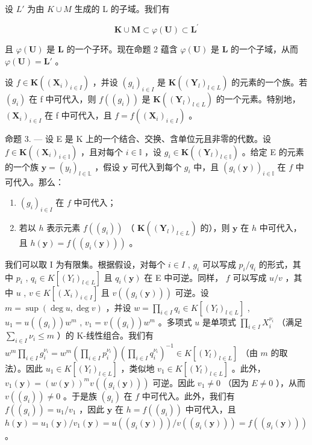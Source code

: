 设 \(L'\) 为由 \(K \cup M\) 生成的 L 的子域。我们有

\[
\mathbf {K} \cup \mathbf {M} \subset \varphi (\mathbf {U}) \subset \mathbf {L} ^ {\prime}
\]

且 \(\varphi(\mathbf{U})\) 是 \(\mathbf{L}\) 的一个子环。现在命题 2 蕴含 \(\varphi(\mathbf{U})\) 是 \(\mathbf{L}\) 的一个子域，从而 \(\varphi(\mathbf{U}) = \mathbf{L}'\) 。

设 \(f \in \mathbf{K}((\mathbf{X}_i)_{i \in I})\) ，并设 \((g_i)_{i \in I}\) 是 \(\mathbf{K}((\mathbf{Y}_l)_{l \in L})\) 的元素的一个族。若 \((g_{i})\) 在 f 中可代入，则 \(f((g_{i}))\) 是 \(\mathbf{K}((\mathbf{Y}_{l})_{l\in L})\) 的一个元素。特别地， \((\mathbf{X}_{i})_{i\in I}\) 在 f 中可代入，且 \(f=f((\mathbf{X}_{i})_{i\in I})\) 。

命题 3. --- 设 E 是 K 上的一个结合、交换、含单位元且非零的代数。设 \(f \in \mathbf{K}((\mathbf{X}_i)_{i \in \mathbb{I}})\) ，且对每个 \(i \in \mathbb{I}\) ，设 \(g_i \in \mathbf{K}((\mathbf{Y}_l)_{l \in \mathbb{I}})\) 。给定 E 的元素的一个族 \(\mathbf{y} = (y_l)_{l \in \mathbb{L}}\) ，假设 \(\mathbf{y}\) 可代入到每个 \(g_i\) 中，且 \((g_i(\mathbf{y}))_{i \in \mathbb{I}}\) 在 \(f\) 中可代入。那么：

\begin{enumerate}
\def\labelenumi{(\roman{enumi})}
\item
  \((g_{i})_{i\in I}\) 在 \(f\) 中可代入；
\item
  若以 \(h\) 表示元素 \(f((g_i))\) （ \(\mathbf{K}((\mathbf{Y}_l)_{l \in L})\) 的），则 \(\mathbf{y}\) 在 \(h\) 中可代入，且 \(h(\mathbf{y}) = f((g_i(\mathbf{y})))\) 。
\end{enumerate}

我们可以取 I 为有限集。根据假设，对每个 \(i \in I\) , \(g_i\) 可以写成 \(p_i/q_i\) 的形式，其中 \(p_i\) , \(q_i \in K[(Y_l)_{l \in L}]\) 且 \(q_i(\mathbf{y})\) 在 E 中可逆。同样， \(f\) 可以写成 \(u/v\) ，其中 \(u\) , \(v \in K[(X_i)_{i \in I}]\) 且 \(v((g_i(\mathbf{y})))\) 可逆。设 \(m = \sup(\deg u, \deg v)\) ，并设 \(w = \prod_{i \in I} q_i \in K[(Y_l)_{l \in L}]\) , \(u_1 = u((g_i))w^m\) , \(v_1 = v((g_i))w^m\) 。多项式 \(u\) 是单项式 \(\prod_{i \in I} X_i^{\nu_i}\) （满足 \(\sum_{i \in I} \nu_i \leqslant m\) ）的 K-线性组合。我们有 \(w^m \prod_{i \in I} g_i^{\nu_i} = w^m\left(\prod_{i \in I} p_i^{\nu_i}\right)\left(\prod_{i \in I} q_i^{\nu_i}\right)^{-1} \in K[(Y_l)_{l \in L}]\) （由 \(m\) 的取法）。因此 \(u_1 \in K[(Y_l)_{l \in L}]\) ，类似地 \(v_1 \in K[(Y_l)_{l \in L}]\) 。此外， \(v_1(\mathbf{y}) = (w(\mathbf{y}))^m v((g_i(\mathbf{y})))\) 可逆。因此 \(v_1 \neq 0\) （因为 \(E \neq 0\) ），从而 \(v((g_i)) \neq 0\) 。于是族 \((g_i)\) 在 \(f\) 中可代入。此外，我们有 \(f((g_i)) = u_1/v_1\) ，因此 \(\mathbf{y}\) 在 \(h = f((g_i))\) 中可代入，且 \(h(\mathbf{y}) = u_1(\mathbf{y})/v_1(\mathbf{y}) = u((g_i(\mathbf{y})))/v((g_i(\mathbf{y}))) = f((g_i(\mathbf{y})))\) 。

